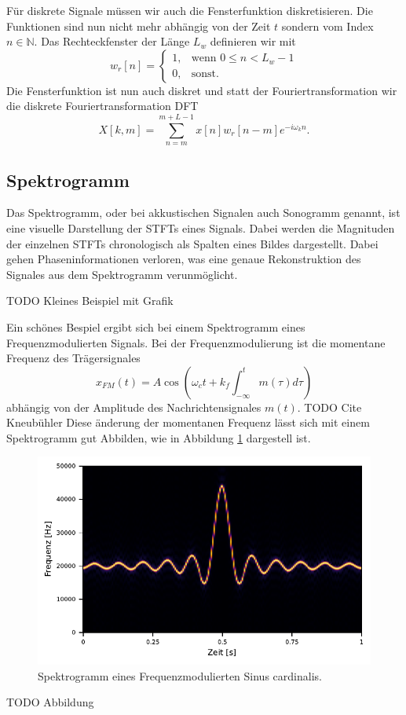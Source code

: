 Für diskrete Signale müssen wir auch die Fensterfunktion diskretisieren.
Die Funktionen sind nun nicht mehr abhängig von der Zeit $t$ sondern vom 
Index $n \in \mathbb{N}$.
Das Rechteckfenster der Länge $L_w$ definieren wir mit
\begin{equation}
    w_r[n] = 
    \begin{cases}
    1,& \text{wenn } 0 \le n < L_w-1\\
    0, & \text{sonst.}
    \end{cases}
\end{equation}
Die Fensterfunktion ist nun auch diskret und statt
der Fouriertransformation wir die diskrete Fouriertransformation DFT
\begin{equation}
    X[k, m] = \sum_{n = m}^{m + L - 1} x[n] w_r[n-m] e^{ -i \omega_k n}.
\end{equation}

\subsection{Spektrogramm}

Das Spektrogramm, oder bei akkustischen Signalen auch Sonogramm genannt, ist eine visuelle
Darstellung der STFTs eines Signals. 
Dabei werden die Magnituden der einzelnen STFTs chronologisch
als Spalten eines Bildes dargestellt.
Dabei gehen Phaseninformationen verloren, was eine genaue Rekonstruktion
des Signales aus dem Spektrogramm verunmöglicht.

TODO Kleines Beispiel mit Grafik

Ein schönes Bespiel ergibt sich bei einem Spektrogramm eines Frequenzmodulierten 
Signals.
Bei der Frequenzmodulierung ist die momentane Frequenz des Trägersignales 
\begin{equation}
    x_{FM}(t) = A \cos\left( \omega_c t + k_f \int_{-\infty}^{t} m(\tau) d\tau\right)
\end{equation}
abhängig von der Amplitude des Nachrichtensignales $m(t)$.
TODO Cite Kneubühler
Diese änderung der momentanen Frequenz lässt sich mit einem Spektrogramm gut Abbilden, 
wie in Abbildung \ref{sonogramm:fmsono} dargestell ist.
\begin{figure}
    \centering
    \includegraphics{papers/sonogramm/images/fm_sono_windows.pdf}
    \caption{Spektrogramm eines Frequenzmodulierten Sinus cardinalis.
    \label{sonogramm:fmsono}
    }
\end{figure}
TODO Abbildung

